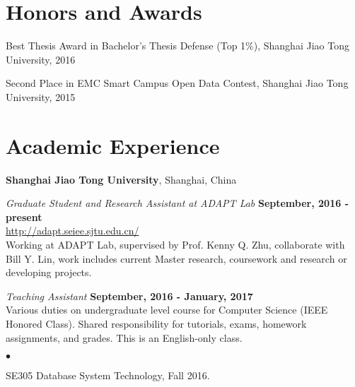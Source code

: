 \documentclass[margin,line]{res}
\newenvironment{list1}{
  \begin{list}{\ding{113}}{%
      \setlength{\itemsep}{0in}
      \setlength{\parsep}{0in} \setlength{\parskip}{0in}
      \setlength{\topsep}{0in} \setlength{\partopsep}{0in} 
      \setlength{\leftmargin}{0.17in}}}{\end{list}}
\newenvironment{list2}{
  \begin{list}{$\bullet$}{%
      \setlength{\itemsep}{0in}
      \setlength{\parsep}{0in} \setlength{\parskip}{0in}
      \setlength{\topsep}{0in} \setlength{\partopsep}{0in} 
      \setlength{\leftmargin}{0.2in}}}{\end{list}}
\begin{document}
\begin{resume}
%


\section{\sc Honors and Awards} 
Best Thesis Award in Bachelor's Thesis Defense (Top 1\%), Shanghai Jiao Tong University, 2016

\vspace*{-2.5mm}
Second Place in EMC Smart Campus Open Data Contest, Shanghai Jiao Tong University, 2015


\section{\sc Academic Experience}
{\bf Shanghai Jiao Tong University}, Shanghai, China

\vspace{-.3cm}
{\em Graduate Student and Research Assistant at ADAPT Lab} \hfill {\bf September, 2016 - present}\\
\url{http://adapt.seiee.sjtu.edu.cn/}\\
Working at ADAPT Lab, supervised by Prof. Kenny Q. Zhu, collaborate with Bill Y. Lin, work includes current Master research, coursework and
research or developing projects.

{\em Teaching Assistant} \hfill {\bf September, 2016 - January, 2017}\\
Various duties on undergraduate level course for Computer Science (IEEE Honored Class). Shared responsibility for tutorials, exams, homework assignments, and grades. This is an English-only class.
\begin{list2}
\item SE305 Database System Technology, Fall 2016.
\end{list2}


\end{resume}
\end{document}
